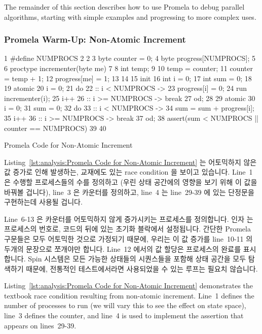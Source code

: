 The remainder of this section describes how to use Promela to debug
parallel algorithms, starting with simple examples and progressing to
more complex uses.
\fi

\subsubsection{Promela Warm-Up: Non-Atomic Increment}
\label{sec:formal:Promela Warm-Up: Non-Atomic Increment}

\begin{listing}[tbp]
{ \scriptsize
\begin{verbbox}
  1 #define NUMPROCS 2
  2
  3 byte counter = 0;
  4 byte progress[NUMPROCS];
  5
  6 proctype incrementer(byte me)
  7 {
  8   int temp;
  9
 10   temp = counter;
 11   counter = temp + 1;
 12   progress[me] = 1;
 13 }
 14
 15 init {
 16   int i = 0;
 17   int sum = 0;
 18
 19   atomic {
 20     i = 0;
 21     do
 22     :: i < NUMPROCS ->
 23       progress[i] = 0;
 24       run incrementer(i);
 25       i++
 26     :: i >= NUMPROCS -> break
 27     od;
 28   }
 29   atomic {
 30     i = 0;
 31     sum = 0;
 32     do
 33     :: i < NUMPROCS ->
 34       sum = sum + progress[i];
 35       i++
 36     :: i >= NUMPROCS -> break
 37     od;
 38     assert(sum < NUMPROCS || counter == NUMPROCS)
 39   }
 40 }
\end{verbbox}
}
\centering
\theverbbox
\caption{Promela Code for Non-Atomic Increment}
\label{lst:analysis:Promela Code for Non-Atomic Increment}
\end{listing}

Listing~\ref{lst:analysis:Promela Code for Non-Atomic Increment}
는 어토믹하지 않은 값 증가로 인해 발생하는, 교재에도 있는 race condition 을
보이고 있습니다.
Line~1 은 수행할 프로세스들의 수를 정의하고 (우린 상태 공간에의 영향을 보기
위해 이 값을 바꿔볼 겁니다), line~3 은 카운터를 정의하고, line~4 는 line~29-39
에 있는 단정문을 구현하는데 사용될 겁니다.

Line~6-13 은 카운터를 어토믹하지 않게 증가시키는 프로세스를 정의합니다.
인자  는 프로세스의 번호로, 코드의 뒤에 있는 초기화 블락에서 설정됩니다.
간단한 Promela 구문들은 모두 어토믹한 것으로 가정되기 때문에, 우리는 이 값
증가를 line~10-11 의 두개의 문장으로 쪼개야만 합니다.
Line~12 에서의 값 할당은 프로세스의 완료를 표시합니다.
Spin 시스템은 모든 가능한 상태들의 시퀀스들을 포함해 상태 공간을 모두 탐색하기
때문에, 전통적인 테스트에서라면 사용되었을 수 있는 루프는 필요치 않습니다.
\iffalse

Listing~\ref{lst:analysis:Promela Code for Non-Atomic Increment}
demonstrates the textbook race condition
resulting from non-atomic increment.
Line~1 defines the number of processes to run (we will vary this
to see the effect on state space), line~3 defines the counter,
and line~4 is used to implement the assertion that appears on
lines~29-39.

